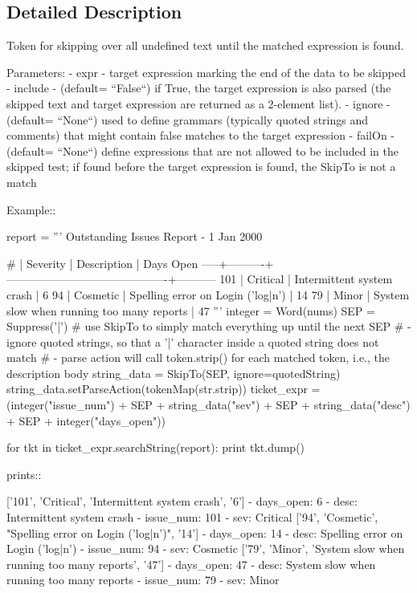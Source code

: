 \subsection{Detailed Description}
\begin{DoxyVerb}Token for skipping over all undefined text until the matched
expression is found.

Parameters:
 - expr - target expression marking the end of the data to be skipped
 - include - (default= ``False``) if True, the target expression is also parsed
      (the skipped text and target expression are returned as a 2-element list).
 - ignore - (default= ``None``) used to define grammars (typically quoted strings and
      comments) that might contain false matches to the target expression
 - failOn - (default= ``None``) define expressions that are not allowed to be
      included in the skipped test; if found before the target expression is found,
      the SkipTo is not a match

Example::

    report = '''
        Outstanding Issues Report - 1 Jan 2000

           # | Severity | Description                               |  Days Open
        -----+----------+-------------------------------------------+-----------
         101 | Critical | Intermittent system crash                 |          6
          94 | Cosmetic | Spelling error on Login ('log|n')         |         14
          79 | Minor    | System slow when running too many reports |         47
        '''
    integer = Word(nums)
    SEP = Suppress('|')
    # use SkipTo to simply match everything up until the next SEP
    # - ignore quoted strings, so that a '|' character inside a quoted string does not match
    # - parse action will call token.strip() for each matched token, i.e., the description body
    string_data = SkipTo(SEP, ignore=quotedString)
    string_data.setParseAction(tokenMap(str.strip))
    ticket_expr = (integer("issue_num") + SEP
                  + string_data("sev") + SEP
                  + string_data("desc") + SEP
                  + integer("days_open"))

    for tkt in ticket_expr.searchString(report):
        print tkt.dump()

prints::

    ['101', 'Critical', 'Intermittent system crash', '6']
    - days_open: 6
    - desc: Intermittent system crash
    - issue_num: 101
    - sev: Critical
    ['94', 'Cosmetic', "Spelling error on Login ('log|n')", '14']
    - days_open: 14
    - desc: Spelling error on Login ('log|n')
    - issue_num: 94
    - sev: Cosmetic
    ['79', 'Minor', 'System slow when running too many reports', '47']
    - days_open: 47
    - desc: System slow when running too many reports
    - issue_num: 79
    - sev: Minor
\end{DoxyVerb}
 

